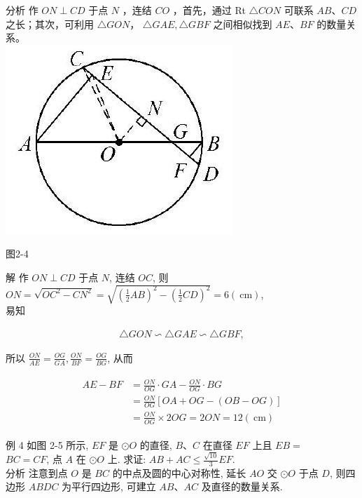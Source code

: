 \documentclass[10pt]{article}
\begin{document}
分析 作 $O N \perp C D$ 于点 $N$ ，连结 $C O$ ，首先，通过 Rt $\triangle C O N$ 可联系 $A B 、 C D$ 之长；其次，可利用 $\triangle G O N ，$ $\triangle G A E, \triangle G B F$ 之间相似找到 $A E 、 B F$ 的数量关系。\\
\includegraphics[max width=\textwidth, center]{2024_10_30_66b8e5e701da2093c133g-018(1)}

图2-4

解 作 $O N \perp C D$ 于点 $N$, 连结 $O C$, 则\\
$O N=\sqrt{O C^{2}-C N^{2}}=\sqrt{\left(\frac{1}{2} A B\right)^{2}-\left(\frac{1}{2} C D\right)^{2}}=6(\mathrm{~cm})$,\\
易知

\begin{align*}
\triangle G O N \backsim \triangle G A E \backsim \triangle G B F,
\end{align*}

所以 $\frac{O N}{A E}=\frac{O G}{G A}, \frac{O N}{B F}=\frac{O G}{B G}$, 从而

\begin{align*}
\begin{aligned}
A E-B F & =\frac{O N}{O G} \cdot G A-\frac{O N}{O G} \cdot B G \\
& =\frac{O N}{O G}[O A+O G-(O B-O G)] \\
& =\frac{O N}{O G} \times 2 O G=2 O N=12(\mathrm{~cm})
\end{aligned}
\end{align*}

例 4 如图 2-5 所示, $E F$ 是 $\odot O$ 的直径, $B 、 C$ 在直径 $E F$ 上且 $E B=$\\
$B C=C F$, 点 $A$ 在 $\odot O$ 上. 求证: $A B+A C \leqslant \frac{\sqrt{10}}{3} E F$.\\
分析 注意到点 $O$ 是 $B C$ 的中点及圆的中心对称性, 延长 $A O$ 交 $\odot O$ 于点 $D$, 则四边形 $A B D C$ 为平行四边形, 可建立 $A B 、 A C$ 及直径的数量关系.
\end{document}

